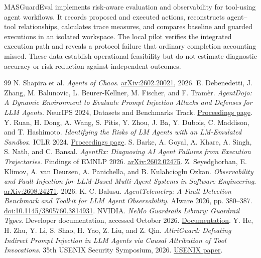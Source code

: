MASGuardEval implements risk-aware evaluation and observability for tool-using agent workflows. It records proposed and executed actions, reconstructs agent--tool relationships, calculates trace measures, and compares baseline and guarded executions in an isolated workspace. The local pilot verifies the integrated execution path and reveals a protocol failure that ordinary completion accounting missed. These data establish operational feasibility but do not estimate diagnostic accuracy or risk reduction against independent outcomes.

\begin{thebibliography}{99}
 N. Shapira et al. \emph{Agents of Chaos}. \href{https://arxiv.org/abs/2602.20021}{arXiv:2602.20021}, 2026.
 E. Debenedetti, J. Zhang, M. Balunovic, L. Beurer-Kellner, M. Fischer, and F. Tram\`er. \emph{AgentDojo: A Dynamic Environment to Evaluate Prompt Injection Attacks and Defenses for LLM Agents}. NeurIPS 2024, Datasets and Benchmarks Track. \href{https://proceedings.neurips.cc/paper_files/paper/2024/hash/97091a5177d8dc64b1da8bf3e1f6fb54-Abstract-Datasets_and_Benchmarks_Track.html}{Proceedings page}.
 Y. Ruan, H. Dong, A. Wang, S. Pitis, Y. Zhou, J. Ba, Y. Dubois, C. Maddison, and T. Hashimoto. \emph{Identifying the Risks of LM Agents with an LM-Emulated Sandbox}. ICLR 2024. \href{https://proceedings.iclr.cc/paper_files/paper/2024/hash/7274ed909a312d4d869cc328ad1c5f04-Abstract-Conference.html}{Proceedings page}.
 S. Barke, A. Goyal, A. Khare, A. Singh, S. Nath, and C. Bansal. \emph{AgentRx: Diagnosing AI Agent Failures from Execution Trajectories}. Findings of EMNLP 2026. \href{https://arxiv.org/abs/2602.02475}{arXiv:2602.02475}.
 Z. Seyedghorban, E. Klimov, A. van Deursen, A. Panichella, and B. Kulahcioglu Ozkan. \emph{Observability and Fault Injection for LLM-Based Multi-Agent Systems in Software Engineering}. \href{https://arxiv.org/abs/2608.24271}{arXiv:2608.24271}, 2026.
 K. C. Balusu. \emph{AgentTelemetry: A Fault Detection Benchmark and Toolkit for LLM Agent Observability}. AIware 2026, pp. 380--387. \href{https://doi.org/10.1145/3805760.3814931}{doi:10.1145/3805760.3814931}.
 NVIDIA. \emph{NeMo Guardrails Library: Guardrail Types}. Developer documentation, accessed October 2026. \href{https://docs.nvidia.com/nemo/guardrails/latest/about-nemo-guardrails-library/rail-types}{Documentation}.
 Y. He, H. Zhu, Y. Li, S. Shao, H. Yao, Z. Liu, and Z. Qin. \emph{AttriGuard: Defeating Indirect Prompt Injection in LLM Agents via Causal Attribution of Tool Invocations}. 35th USENIX Security Symposium, 2026. \href{https://www.usenix.org/system/files/usenixsecurity26-he-yu.pdf}{USENIX paper}.
\end{thebibliography}

